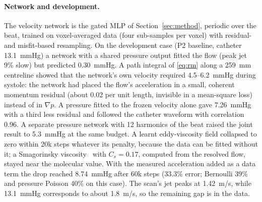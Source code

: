 \paragraph{Network and development.} The velocity network is the gated MLP of Section~\ref{sec:method}, periodic over
the beat, trained on voxel-averaged data (four sub-samples per voxel) with residual- and misfit-based resampling. On
the development case (P2 baseline, catheter 13.1~mmHg) a network with a shared pressure output fitted the flow (peak
jet 9\% slow) but predicted 0.30~mmHg. A path integral of \eqref{eq:rm} along a 259~mm centreline showed that the
network's own velocity required 4.5--6.2~mmHg during systole: the network had placed the flow's acceleration in a
small, coherent momentum residual (about 0.02 per unit length, invisible in a mean-square loss) instead of in
$\nabla p$. A pressure fitted to the frozen velocity alone gave 7.26~mmHg with a third less residual and followed the
catheter waveform with correlation 0.96. A separate pressure network with 12 harmonics of the beat raised the joint
result to 5.3~mmHg at the same budget. A learnt eddy-viscosity field collapsed to zero within 20k steps whatever its
penalty, because the data can be fitted without it; a Smagorinsky viscosity~\cite{smagorinsky1963} with $C_s=0.17$,
computed from the resolved flow, stayed near the molecular value. With the measured acceleration added as a data term
the drop reached 8.74~mmHg after 60k steps (33.3\% error; Bernoulli 39\% and pressure Poisson 40\% on this case). The
scan's jet peaks at 1.42~m/s, while 13.1~mmHg corresponds to about 1.8~m/s, so the remaining gap is in the data.

